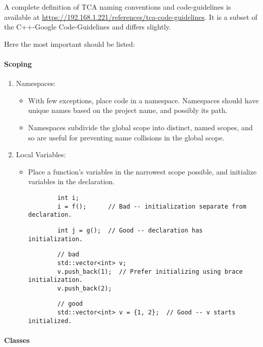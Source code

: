 A complete definition of TCA naming conventions and code-guidelines is available at \url{https://192.168.1.221/references/tca-code-guidelines}. It is a subset of the C++-Google Code-Guidelines and differs slightly.

Here the most important should be listed:

\paragraph{Scoping}

\begin{enumerate}
	\item Namespaces:
	\begin{itemize}
		\item With few exceptions, place code in a namespace. Namespaces should have unique names based on the project name, and possibly its path.
		\item Namespaces subdivide the global scope into distinct, named scopes, and so are useful for preventing name collisions in the global scope.
	\end{itemize}

	\item Local Variables:
	\begin{itemize}
		\item Place a function's variables in the narrowest scope possible, and initialize variables in the declaration.
		
		\begin{verbatim}
		int i;
		i = f();      // Bad -- initialization separate from declaration.
		\end{verbatim}
		
		\begin{verbatim}
		int j = g();  // Good -- declaration has initialization.
		\end{verbatim}
		
		\begin{verbatim}
		// bad
		std::vector<int> v;
		v.push_back(1);  // Prefer initializing using brace initialization.
		v.push_back(2);
		\end{verbatim}
		
		\begin{verbatim}
		// good
		std::vector<int> v = {1, 2};  // Good -- v starts initialized.
		\end{verbatim}
	\end{itemize}
\end{enumerate}

\paragraph{Classes}

